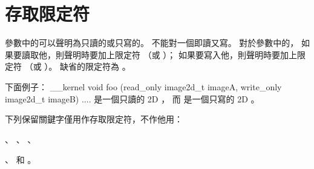 \section{存取限定符}

參數中的可以聲明為只讀的或只寫的。
不能對一個即讀又寫。
對於參數中的，
如果要讀取他，則聲明時要加上限定符  （或 ）；
如果要寫入他，則聲明時要加上限定符  （或 ）。
缺省的限定符為 。

下面例子：
\startclc
__kernel void foo (read_only image2d_t imageA,
		   write_only image2d_t imageB)
{
	....
}
\stopclc
{} 是一個只讀的 2D ，
而  是一個只寫的 2D 。

下列保留關鍵字僅用作存取限定符，不作他用：
\startigBase
\item {}、 、 、
\item {}、  和 。
\stopigBase
